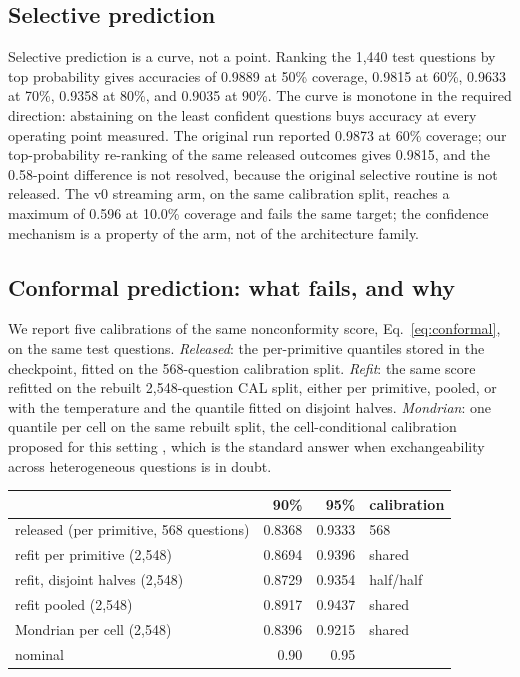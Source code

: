 \subsection{Selective prediction}
Selective prediction is a curve, not a point. Ranking the 1{,}440 test questions by top probability
gives accuracies of 0.9889 at 50\% coverage, 0.9815 at 60\%, 0.9633 at 70\%, 0.9358 at 80\%, and
0.9035 at 90\%. The curve is monotone in the required direction: abstaining on the least confident
questions buys accuracy at every operating point measured. The original run reported 0.9873 at 60\%
coverage; our top-probability re-ranking of the same released outcomes gives 0.9815, and the
0.58-point difference is not resolved, because the original selective routine is not released.
The v0 streaming arm, on the same calibration split, reaches a maximum of 0.596 at 10.0\% coverage
and fails the same target; the confidence mechanism is a property of the \vsix{} arm, not of the
architecture family.

\subsection{Conformal prediction: what fails, and why}
\label{sec:conformal}

We report five calibrations of the same nonconformity score, Eq.~\eqref{eq:conformal}, on the same
test questions. \emph{Released}: the per-primitive quantiles stored in the checkpoint, fitted on the
568-question calibration split. \emph{Refit}: the same score refitted on the rebuilt
2{,}548-question CAL split, either per primitive, pooled, or with the temperature and the quantile
fitted on disjoint halves. \emph{Mondrian}: one quantile per cell on the same rebuilt split, the
cell-conditional calibration proposed for this setting \citep{vovk2012conditional}, which is the standard answer when
exchangeability across heterogeneous questions is in doubt.

\begin{center}
\footnotesize
\begin{tabular}{lrrl}
\toprule
 & 90\% & 95\% & calibration \\
\midrule
released (per primitive, 568 questions) & 0.8368 & 0.9333 & 568 \\
refit per primitive (2{,}548) & 0.8694 & 0.9396 & shared \\
refit, disjoint halves (2{,}548) & 0.8729 & 0.9354 & half/half \\
refit pooled (2{,}548) & 0.8917 & 0.9437 & shared \\
Mondrian per cell (2{,}548) & 0.8396 & 0.9215 & shared \\
\midrule
nominal & 0.90 & 0.95 & \\
\bottomrule
\end{tabular}
\end{center}

